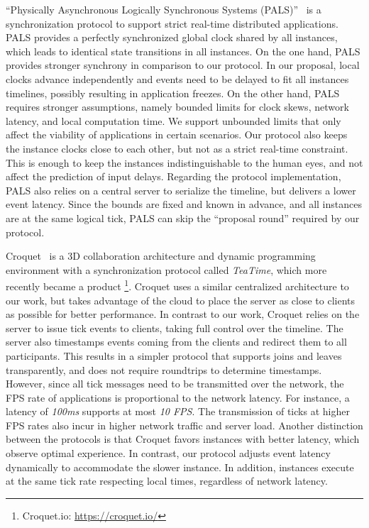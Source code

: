 \documentclass[sigplan,screen]{acmart}
\begin{document}
``Physically Asynchronous Logically Synchronous Systems (PALS)''~\cite{gals.pals}
is a synchronization protocol to support strict real-time distributed
applications.
PALS provides a perfectly synchronized global clock shared by all instances,
which leads to identical state transitions in all instances.
%
On the one hand, PALS provides stronger synchrony in comparison to our
protocol.
In our proposal, local clocks advance independently and events need to be
delayed to fit all instances timelines, possibly resulting in application
freezes.
%
On the other hand, PALS requires stronger assumptions, namely bounded limits
for clock skews, network latency, and local computation time.
We support unbounded limits that only affect the viability of applications in
certain scenarios.
%
Our protocol also keeps the instance clocks close to each other, but not as a
strict real-time constraint.
This is enough to keep the instances indistinguishable to the human eyes, and
not affect the prediction of input delays.
%
Regarding the protocol implementation, PALS also relies on a central server to
serialize the timeline, but delivers a lower event latency.
Since the bounds are fixed and known in advance, and all instances are
at the same logical tick, PALS can skip the ``proposal round'' required by our
protocol.

Croquet~\cite{croquet} is a 3D collaboration architecture and dynamic
programming environment with a synchronization protocol called \emph{TeaTime},
which more recently became a product%
\footnote{Croquet.io: \url{https://croquet.io/}}.
Croquet uses a similar centralized architecture to our work, but takes
advantage of the cloud to place the server as close to clients as possible for
better performance.
In contrast to our work, Croquet relies on the server to issue tick events to
clients, taking full control over the timeline.
The server also timestamps events coming from the clients and redirect them to
all participants.
This results in a simpler protocol that supports joins and leaves
transparently, and does not require roundtrips to determine timestamps.
However, since all tick messages need to be transmitted over the network, the
FPS rate of applications is proportional to the network latency.
For instance, a latency of \emph{100ms} supports at most \emph{10 FPS}.
The transmission of ticks at higher FPS rates also incur in higher network
traffic and server load.
Another distinction between the protocols is that Croquet favors instances with
better latency, which observe optimal experience.
In contrast, our protocol adjusts event latency dynamically to accommodate the
slower instance.
In addition, instances execute at the same tick rate respecting local times,
regardless of network latency.
\end{document}
